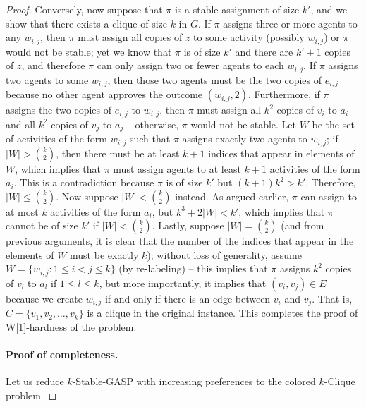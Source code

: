 \begin{proof}
	Conversely, now suppose that $\pi$ is a stable assignment of size $k'$, and we show that there exists a clique of size $k$ in $G$. 
	If $\pi$ assigns three or more agents to any $w_{i,j}$, then $\pi$ must assign all copies of $z$ to some activity (possibly $w_{i,j}$) or $\pi$ would not be stable; yet we know that $\pi$ is of size $k'$ and there are $k'+1$ copies of $z$, and therefore $\pi$ can only assign two or fewer agents to each $w_{i,j}$. 
	If $\pi$ assigns two agents to some $w_{i,j}$, then those two agents must be the two copies of $e_{i,j}$ because no other agent approves the outcome $(w_{i,j}, 2)$. 
	Furthermore, if $\pi$ assigns the two copies of $e_{i,j}$ to $w_{i,j}$, then $\pi$ must assign all $k^2$ copies of $v_i$ to $a_i$ and all $k^2$ copies of $v_j$ to $a_j$ -- otherwise, $\pi$ would not be stable. Let $W$ be the set of activities of the form $w_{i,j}$ such that $\pi$ assigns exactly two agents to $w_{i,j}$; if $|W| > \binom{k}{2}$, then there must be at least $k+1$ indices that appear in elements of $W$, which implies that $\pi$ must assign agents to at least $k+1$ activities of the form $a_i$. 
	This is a contradiction because $\pi$ is of size $k'$ but $(k+1)k^2 > k'$. 
	Therefore, $|W| \leq \binom{k}{2}$. 
	Now suppose $|W| < \binom{k}{2}$ instead. 
	As argued earlier, $\pi$ can assign to at most $k$ activities of the form $a_i$, but $k^3 + 2|W| < k'$, which implies that $\pi$ cannot be of size $k'$ if $|W| < \binom{k}{2}$. 
	Lastly, suppose $|W| = \binom{k}{2}$ (and from previous arguments, it is clear that the number of the indices that appear in the elements of $W$ must be exactly $k$); without loss of generality, assume $W = \{w_{i,j} : 1 \leq i < j \leq k\}$ (by re-labeling) -- this implies that $\pi$ assigns $k^2$ copies of $v_l$ to $a_l$ if $1 \leq l \leq k$, but more importantly, it implies that $(v_i, v_j) \in E$ because we create $w_{i,j}$ if and only if there is an edge between $v_i$ and $v_j$. 
	That is, $C = \{v_1, v_2, \dots, v_k\}$ is a clique in the original instance. 
	This completes the proof of W[1]-hardness of the problem.

	\paragraph{Proof of completeness.} %
	Let us reduce $k$-Stable-GASP with increasing preferences to the colored $k$-Clique problem.
	

\end{proof}
